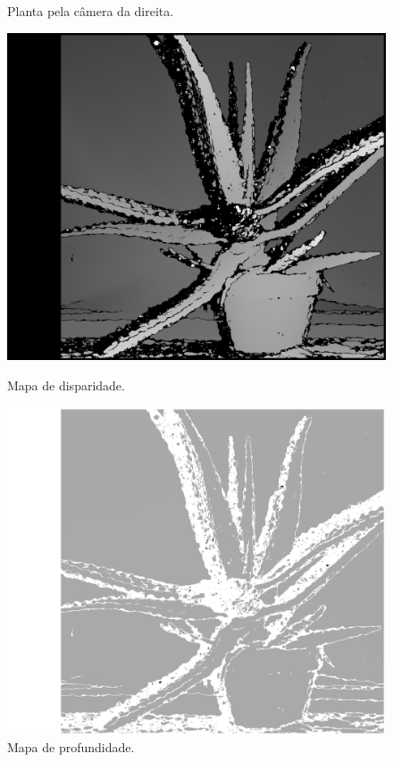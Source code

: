 \documentclass{bmvc2k}
\begin{document}
\begin{figure}[htb]
\begin{minipage}[t]{0.2\textwidth}
  \caption{Planta pela câmera da direita.}
  \label{fig:aloeR}
\end{minipage}\hfill
\begin{minipage}[t]{0.2\textwidth}
  \centering
  \includegraphics[width=\linewidth]{figs/aloe_disp.png}
  \caption{Mapa de disparidade.}
  \label{fig:aloe_disp}
\end{minipage}\hfill
\begin{minipage}[t]{0.2\textwidth}
  \centering
  \includegraphics[width=\linewidth]{figs/aloe_depth.png}
  \caption{Mapa de profundidade.}
  \label{fig:aloe_depth}
\end{minipage}
\end{figure}
\end{document}

